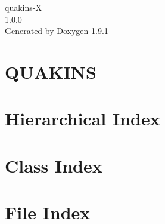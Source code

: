 \let\mypdfximage\pdfximage\def\pdfximage{\immediate\mypdfximage}\documentclass[twoside]{book}
\newcommand{\+}{\discretionary{\mbox{\scriptsize$\hookleftarrow$}}{}{}}
\newcommand{\clearemptydoublepage}{%
  \newpage{\pagestyle{empty}\cleardoublepage}%
}
\begin{document}
\raggedbottom

\hypersetup{pageanchor=false,
             bookmarksnumbered=true,
             pdfencoding=unicode
            }
\begin{titlepage}
\vspace*{7cm}
\begin{center}%
{\Large quakins-\/X \\[1ex]\large 1.\+0.\+0 }\\
\vspace*{1cm}
{\large Generated by Doxygen 1.9.1}\\
\end{center}
\end{titlepage}
\clearemptydoublepage
{}
\tableofcontents
\clearemptydoublepage
{}
\hypersetup{pageanchor=true}

\chapter{QUAKINS}
\label{md_README}

\chapter{Hierarchical Index}

\chapter{Class Index}

\chapter{File Index}

\end{document}

